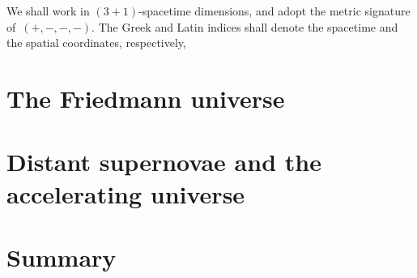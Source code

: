 \documentclass[12pt,a4paper,oneside]{book}
\begin{document}
We shall work in $(3 + 1)$-spacetime dimensions, and adopt the metric 
signature of~$(+,-,-,-)$.
The Greek and Latin indices shall denote the spacetime and the spatial 
coordinates, respectively, 



\chapter{The Friedmann universe}




\section{}

\section{}


\chapter{Distant supernovae and the accelerating universe}


\chapter{Summary}

\end{document}
